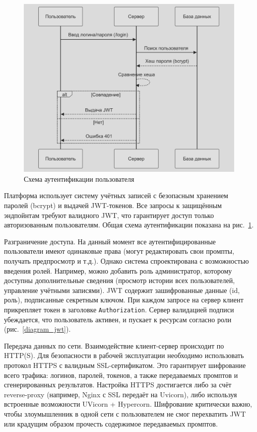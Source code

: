 \begin{figure}[h]
\centering
    \includegraphics[width=1\textwidth]{picture/diploma-deffence-algo-1.png}
\caption{Схема аутентификации пользователя}
\label{diagram_auth}
\end{figure}


Платформа использует систему учётных записей с безопасным хранением паролей (bcrypt) и выдачей JWT-токенов. Все запросы к защищённым эндпойнтам требуют валидного JWT, что гарантирует доступ только авторизованным пользователям. Общая схема аутентификации показана на рис.~\ref{diagram_auth}.


Разграничение доступа. На данный момент все аутентифицированные пользователи имеют одинаковые права (могут редактировать свои промпты, получать предпросмотр и т.д.). Однако система спроектирована с возможностью введения ролей. Например, можно добавить роль администратор, которому доступны дополнительные сведения (просмотр истории всех пользователей, управление учётными записями).  JWT содержит зашифрованные данные (id, роль), подписанные секретным ключом. При каждом запросе на сервер клиент прикрепляет токен в заголовке \texttt{Authorization}. Сервер валидацией подписи убеждается, что пользователь активен, и пускает к ресурсам согласно роли (рис.~\ref{diagram_jwt}).

Передача данных по сети. Взаимодействие клиент-сервер происходит по HTTP(S). Для безопасности в рабочей эксплуатации необходимо использовать протокол HTTPS с валидным SSL-сертификатом. Это гарантирует шифрование всего трафика: логинов, паролей, токенов, а также передаваемых промптов и сгенерированных результатов. Настройка HTTPS достигается либо за счёт reverse-proxy (например, Nginx с SSL передаёт на Uvicorn), либо используя встроенные возможности UVicorn + Hypercorn. Шифрование критически важно, чтобы злоумышленник в одной сети с пользователем не смог перехватить JWT или крадущим образом прочесть содержимое передаваемых промптов.


